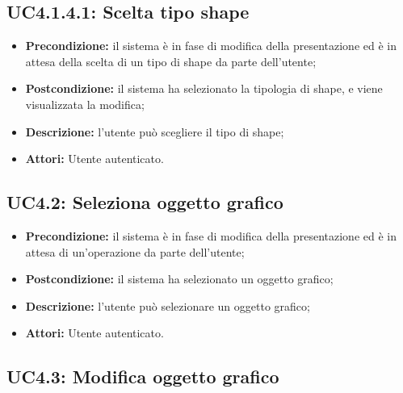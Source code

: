 \subsection{ UC4.1.4.1: Scelta tipo shape}

\begin{itemize}
	\item \textbf{Precondizione:} il sistema è in fase di modifica della presentazione ed è in attesa della scelta di un tipo di shape da parte dell'utente;
	\item \textbf{Postcondizione:} il sistema ha selezionato la tipologia di shape, e viene visualizzata la modifica;
	\item \textbf{Descrizione:} l'utente può scegliere il tipo di shape;
	\item \textbf{Attori:} Utente autenticato.
\end{itemize}
\subsection{ UC4.2: Seleziona oggetto grafico}

\begin{itemize}
	\item \textbf{Precondizione:} il sistema è in fase di modifica della presentazione ed è in attesa di un'operazione da parte dell'utente;
	\item \textbf{Postcondizione:} il sistema ha selezionato un oggetto grafico;
	\item \textbf{Descrizione:} l'utente può selezionare un oggetto grafico;
	\item \textbf{Attori:} Utente autenticato.
\end{itemize}
\subsection{ UC4.3: Modifica oggetto grafico}

